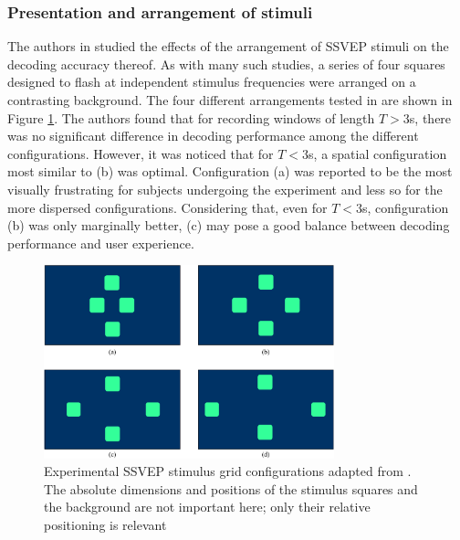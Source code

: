 \subsubsection{Presentation and arrangement of stimuli}
The authors in \cite{zhao-stimulus-layout-effect} studied the effects of the arrangement of SSVEP stimuli on the decoding accuracy thereof. As with many such studies, a series of four squares designed to flash at independent stimulus frequencies were arranged on a contrasting background. The four different arrangements tested in \cite{zhang-mset-cca} are shown in Figure \ref{fig:ssvep-grid-arrangements}. The authors found that for recording windows of length $T>3$s, there was no significant difference in decoding performance among the different configurations. However, it was noticed that for $T < 3$s, a spatial configuration most similar to (b) was optimal. Configuration (a) was reported to be the most visually frustrating for subjects undergoing the experiment and less so for the more dispersed configurations. Considering that, even for $T<3$s, configuration (b) was only marginally better, (c) may pose a good balance between decoding performance and user experience.

\begin{figure}[h]
    \centering
    \includegraphics[width=0.75\textwidth]{grid-arrangements}
    \caption[Experimental SSVEP stimulus grid configurations adapted from \cite{zhao-stimulus-layout-effect}]{Experimental SSVEP stimulus grid configurations adapted from \cite{zhao-stimulus-layout-effect}. The absolute dimensions and positions of the stimulus squares and the background are not important here; only their relative positioning is relevant}
    \label{fig:ssvep-grid-arrangements}
\end{figure}


